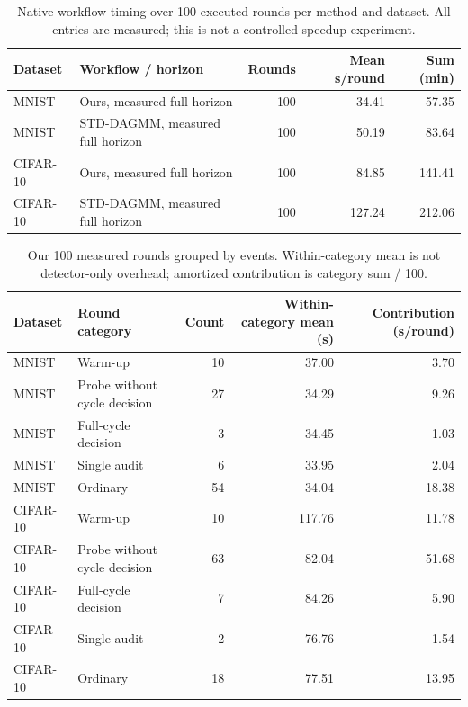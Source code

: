 \documentclass[11pt,a4paper]{article}
\begin{document}
\begin{table}[!ht]\centering\footnotesize
\caption{Native-workflow timing over 100 executed rounds per method and dataset. All entries are measured; this is not a controlled speedup experiment.}\label{tab:timing-horizons}
\begin{tabular}{llrrr}\toprule Dataset & Workflow / horizon & Rounds & Mean s/round & Sum (min) \\ \midrule
MNIST & Ours, measured full horizon & 100 & 34.41 & 57.35 \\
MNIST & STD-DAGMM, measured full horizon & 100 & 50.19 & 83.64 \\
CIFAR-10 & Ours, measured full horizon & 100 & 84.85 & 141.41 \\
CIFAR-10 & STD-DAGMM, measured full horizon & 100 & 127.24 & 212.06 \\
\bottomrule\end{tabular}\end{table}
\begin{table}[!ht]\centering\footnotesize
\caption{Our 100 measured rounds grouped by events. Within-category mean is not detector-only overhead; amortized contribution is category sum / 100.}\label{tab:timing-phases}
\begin{tabular}{llrrr}\toprule Dataset & Round category & Count & Within-category mean (s) & Contribution (s/round) \\ \midrule
MNIST & Warm-up & 10 & 37.00 & 3.70 \\
MNIST & Probe without cycle decision & 27 & 34.29 & 9.26 \\
MNIST & Full-cycle decision & 3 & 34.45 & 1.03 \\
MNIST & Single audit & 6 & 33.95 & 2.04 \\
MNIST & Ordinary & 54 & 34.04 & 18.38 \\
CIFAR-10 & Warm-up & 10 & 117.76 & 11.78 \\
CIFAR-10 & Probe without cycle decision & 63 & 82.04 & 51.68 \\
CIFAR-10 & Full-cycle decision & 7 & 84.26 & 5.90 \\
CIFAR-10 & Single audit & 2 & 76.76 & 1.54 \\
CIFAR-10 & Ordinary & 18 & 77.51 & 13.95 \\
\bottomrule\end{tabular}\end{table}
\end{document}
